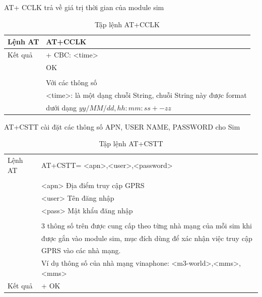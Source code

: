  AT+ CCLK trả về giá trị thời gian của module sim
\begin{table}[htp]
\label{table:at+cclk}
\begin{tabular}{|l|l|}
\hline
Lệnh AT & AT+CCLK \\ \hline
Kết quả  & 
+ CBC: <time> \\
&OK \\
& \\
& Với các thông số \\
& \hspace{0.5cm}<time>: là một dạng chuỗi String, chuỗi String này được format\\
& \hspace{0.5cm} dưới dạng $yy/MM/dd, hh:mm:ss+-zz$ \\\hline
\end{tabular}

\caption[Tập lệnh AT+CCLK: trả về giá trị thời gian của module sim]{Tập lệnh AT+CCLK}
\end{table}



AT+CSTT cài đặt các thông số APN, USER NAME, PASSWORD cho Sim
\begin{table}[htp]
\label{table:at+cstt}
\begin{tabular}{|l|l|}
\hline
Lệnh AT & AT+CSTT= <apn>,<user>,<password> \\ 
& \\
& \hspace{0.5cm}<apn> Địa điểm truy cập GPRS\\
& \hspace{0.5cm}<user> Tên đăng nhập\\
& \hspace{0.5cm}<pass> Mật khẩu đăng nhập\\
& \\
& 3 thông số trên được cung cấp theo từng nhà mạng của mỗi sim khi \\
& được gắn vào module sim, mục đích dùng để xác nhận việc truy cập \\
& GPRS vào các nhà mạng.\\
& Ví dụ thông số của nhà mạng vinaphone: <m3-world>,<mms>,<mms> \\\hline
Kết quả  &+ OK \\\hline
\end{tabular}

\caption[Tập lệnh AT+CSTT: cài đặt các thông số APN, USER NAME, PASSWORD cho Sim]{Tập lệnh AT+CSTT}
\end{table}





